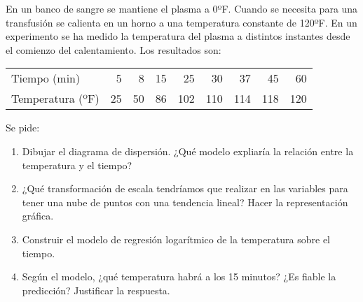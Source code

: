{En un banco de sangre se mantiene el plasma a 0ºF.
Cuando se necesita para una transfusión se calienta en un horno a una temperatura constante de 120ºF.
En un experimento se ha medido la temperatura del plasma a distintos instantes desde el comienzo del calentamiento.
Los resultados son: 
\begin{center}
\begin{tabular}{|lrrrrrrrr|}
\hline
Tiempo (min)	& 5 & 8 & 15 & 25 & 30 & 37 & 45 & 60\\
Temperatura (ºF) & 25 & 50 & 86 & 102 & 110 & 114 & 118 & 120\\
\hline
\end{tabular}
\end{center}
Se pide:
\begin{enumerate}
\item Dibujar el diagrama de dispersión. ¿Qué modelo expliaría la relación entre la temperatura y el tiempo?
\item ¿Qué transformación de escala tendríamos que realizar en las variables para tener una nube de puntos con una
tendencia lineal?
Hacer la representación gráfica. 
\item Construir el modelo de regresión logarítmico de la temperatura sobre el tiempo.
\item Según el modelo, ¿qué temperatura habrá a los 15 minutos?
¿Es fiable la predicción?
Justificar la respuesta.
\end{enumerate}
}
{

}
{}


